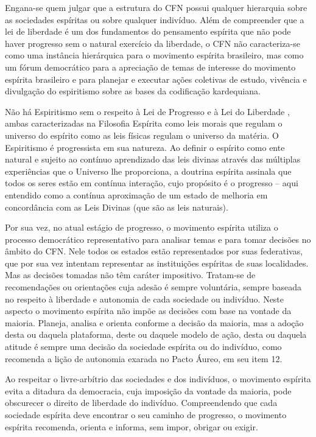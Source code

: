 Engana-se quem julgar que a estrutura do CFN possui qualquer hierarquia sobre as sociedades espíritas ou sobre qualquer indivíduo. Além de compreender que a lei de liberdade é um dos fundamentos do pensamento espírita que não pode haver progresso sem o natural exercício da liberdade, o CFN não caracteriza-se como uma instância hierárquica para o movimento espírita brasileiro, mas como um fórum democrático para a apreciação de temas de interesse do movimento espírita brasileiro e para planejar e executar ações coletivas de estudo, vivência e divulgação do espiritismo sobre as bases da codificação kardequiana. 

Não há Espiritismo sem o respeito à Lei de Progresso \cite[Parte III. Cap. VII ]{Kardec1857} e à Lei do Liberdade \cite[Parte III. Cap.X]{Kardec1857}, ambas caracterizadas na Filosofia Espírita como leis morais que regulam o universo do espírito como as leis físicas regulam o universo da matéria. O Espiritismo é progressista em sua natureza. Ao definir o espírito como ente natural e sujeito ao contínuo aprendizado das leis divinas através das múltiplas experiências que o Universo lhe proporciona, a doutrina espírita assinala que todos os seres estão em contínua interação, cujo propósito é o progresso -- aqui entendido como a contínua aproximação de um estado de melhoria em concordância com as Leis Divinas (que são as leis naturais). 

Por sua vez, no atual estágio de progresso, o movimento espírita utiliza o processo democrático representativo para analisar temas e para tomar decisões no âmbito do CFN. Nele todos os estados estão representados por suas federativas, que por sua vez intentam representar as instituições espíritas de suas localidades. Mas as decisões tomadas não têm caráter impositivo. Tratam-se de recomendações ou orientações cuja adesão é sempre voluntária, sempre baseada no respeito à liberdade e autonomia de cada sociedade ou indivíduo. Neste aspecto o movimento espírita não impõe as decisões com base na vontade da maioria. Planeja, analisa e orienta conforme a decisão da maioria, mas a adoção desta ou daquela plataforma, deste ou daquele modelo de ação, desta ou daquela atitude é sempre uma decisão da sociedade espírita ou do indivíduo, como recomenda a lição de autonomia exarada no Pacto Áureo, em seu item 12.

Ao respeitar o livre-arbítrio das sociedades e dos indivíduos, o movimento espírita evita a ditadura da democracia, cuja imposição da vontade da maioria, pode obscurecer o direito de liberdade do indivíduo. Compreendendo que cada sociedade espírita deve encontrar o seu caminho de progresso, o movimento espírita recomenda, orienta e informa, sem impor, obrigar ou exigir. 

